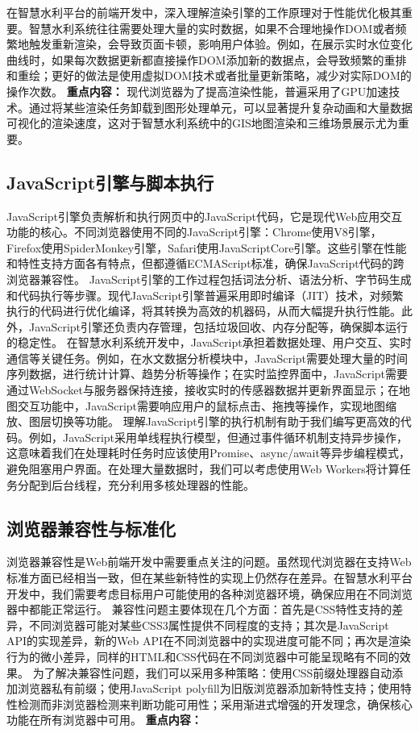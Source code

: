 在智慧水利平台的前端开发中，深入理解渲染引擎的工作原理对于性能优化极其重要。智慧水利系统往往需要处理大量的实时数据，如果不合理地操作DOM或者频繁地触发重新渲染，会导致页面卡顿，影响用户体验。例如，在展示实时水位变化曲线时，如果每次数据更新都直接操作DOM添加新的数据点，会导致频繁的重排和重绘；更好的做法是使用虚拟DOM技术或者批量更新策略，减少对实际DOM的操作次数。 \textbf{重点内容：} 现代浏览器为了提高渲染性能，普遍采用了GPU加速技术。通过将某些渲染任务卸载到图形处理单元，可以显著提升复杂动画和大量数据可视化的渲染速度，这对于智慧水利系统中的GIS地图渲染和三维场景展示尤为重要。 \subsection{JavaScript引擎与脚本执行}\label{javascriptux5f15ux64ceux4e0eux811aux672cux6267ux884c} JavaScript引擎负责解析和执行网页中的JavaScript代码，它是现代Web应用交互功能的核心。不同浏览器使用不同的JavaScript引擎：Chrome使用V8引擎，Firefox使用SpiderMonkey引擎，Safari使用JavaScriptCore引擎。这些引擎在性能和特性支持方面各有特点，但都遵循ECMAScript标准，确保JavaScript代码的跨浏览器兼容性。 JavaScript引擎的工作过程包括词法分析、语法分析、字节码生成和代码执行等步骤。现代JavaScript引擎普遍采用即时编译（JIT）技术，对频繁执行的代码进行优化编译，将其转换为高效的机器码，从而大幅提升执行性能。此外，JavaScript引擎还负责内存管理，包括垃圾回收、内存分配等，确保脚本运行的稳定性。 在智慧水利系统开发中，JavaScript承担着数据处理、用户交互、实时通信等关键任务。例如，在水文数据分析模块中，JavaScript需要处理大量的时间序列数据，进行统计计算、趋势分析等操作；在实时监控界面中，JavaScript需要通过WebSocket与服务器保持连接，接收实时的传感器数据并更新界面显示；在地图交互功能中，JavaScript需要响应用户的鼠标点击、拖拽等操作，实现地图缩放、图层切换等功能。 理解JavaScript引擎的执行机制有助于我们编写更高效的代码。例如，JavaScript采用单线程执行模型，但通过事件循环机制支持异步操作，这意味着我们在处理耗时任务时应该使用Promise、async/await等异步编程模式，避免阻塞用户界面。在处理大量数据时，我们可以考虑使用Web Workers将计算任务分配到后台线程，充分利用多核处理器的性能。 \subsection{浏览器兼容性与标准化}\label{ux6d4fux89c8ux5668ux517cux5bb9ux6027ux4e0eux6807ux51c6ux5316} 浏览器兼容性是Web前端开发中需要重点关注的问题。虽然现代浏览器在支持Web标准方面已经相当一致，但在某些新特性的实现上仍然存在差异。在智慧水利平台开发中，我们需要考虑目标用户可能使用的各种浏览器环境，确保应用在不同浏览器中都能正常运行。 兼容性问题主要体现在几个方面：首先是CSS特性支持的差异，不同浏览器可能对某些CSS3属性提供不同程度的支持；其次是JavaScript API的实现差异，新的Web API在不同浏览器中的实现进度可能不同；再次是渲染行为的微小差异，同样的HTML和CSS代码在不同浏览器中可能呈现略有不同的效果。 为了解决兼容性问题，我们可以采用多种策略：使用CSS前缀处理器自动添加浏览器私有前缀；使用JavaScript polyfill为旧版浏览器添加新特性支持；使用特性检测而非浏览器检测来判断功能可用性；采用渐进式增强的开发理念，确保核心功能在所有浏览器中可用。 \textbf{重点内容：} 